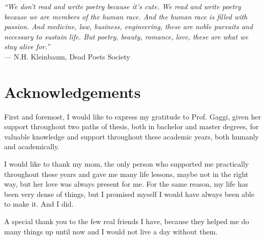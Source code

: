 \cleardoublepage
{}
{}

\begin{flushright}{
    \slshape
    ``We don't read and write poetry because it's cute. We read and write poetry because we are members of the human race. And the human race is filled with passion. And medicine, law, business, engineering, these are noble pursuits and necessary to sustain life. But poetry, beauty, romance, love, these are what we stay alive for.''} \\
    \medskip
    --- N.H. Kleinbaum, Dead Poets Society
\end{flushright}

\begingroup
\let\clearpage\relax
\let\cleardoublepage\relax
\let\cleardoublepage\relax

\chapter*{Acknowledgements}

\noindent First and foremost, I would like to express my gratitude to Prof. Gaggi, given her support throughout two paths of thesis, both in bachelor and master degrees, for valuable knowledge and support throughout these academic years, both humanly and academically. 

\vspace{0.35cm}

\noindent I would like to thank my mom, the only person who supported me practically throughout these years and gave me many life lessons, maybe not in the right way, but her love was always present for me. For the same reason, my life has been very dense of things, but I promised myself I would have always been able to make it. And I did.

\vspace{0.35cm}

\noindent A special thank you to the few real friends I have, because they helped me do many things up until now and I would not live a day without them.

\vspace{0.75cm}

\noindent{\myLocation, \myTime}
\hfill \textit{\myName}

\endgroup
